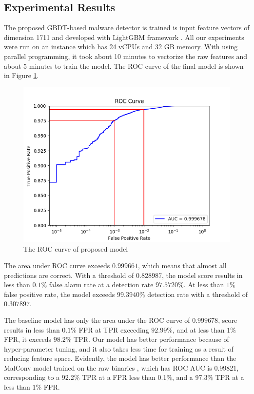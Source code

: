 \documentclass[runningheads]{llncs}
\begin{document}
\subsection{Experimental Results}

The proposed GBDT-based malware detector is trained is input feature vectors of dimension 1711 and developed with LightGBM framework \cite{ke2017lightgbm}. All our experiments were run on an instance which has 24 vCPUs and 32 GB memory. With using parallel programming, it took about 10 minutes to vectorize the raw features and about 5 minutes to train the model. The ROC curve of the final model is shown in Figure \ref{fig:roc_curve_with_highlights}.

\begin{figure}[h]
\centering
\includegraphics[width=\textwidth]{roc_curve_with_highlights.png}
\caption{The ROC curve of proposed model}
\label{fig:roc_curve_with_highlights}
\end{figure}

The area under ROC curve exceeds $0.999661$, which means that almost all predictions are correct. With a threshold of $0.828987$, the model score results in less than $0.1\%$ false alarm rate at a detection rate $97.5720\%$. At less than $1\%$ false positive rate, the model exceeds $99.3940\%$ detection rate with a threshold of $0.307897$. 

The baseline model has only the area under the ROC curve of $0.999678$, score results in less than $0.1\%$ FPR at TPR exceeding $92.99\%$, and at less than $1\%$ FPR, it exceeds $98.2\%$ TPR. Our model has better performance because of hyper-parameter tuning, and it also takes less time for training as a result of reducing feature space. Evidently, the model has better performance than the MalConv model trained on the raw binaries \cite{anderson2018ember}, which has ROC AUC is 0.99821, corresponding to a 92.2\% TPR at a FPR less than 0.1\%, and a 97.3\% TPR at a less than 1\% FPR.
\end{document}
